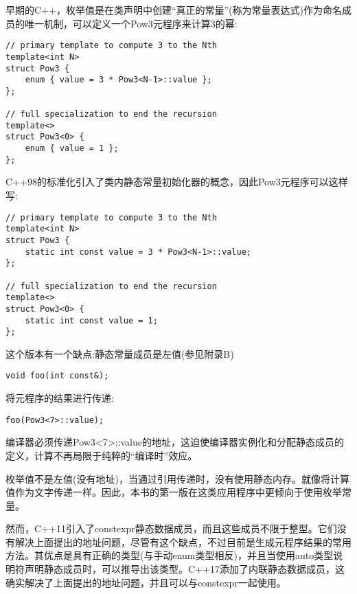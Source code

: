 
早期的C++，枚举值是在类声明中创建“真正的常量”(称为常量表达式)作为命名成员的唯一机制，可以定义一个Pow3元程序来计算3的幂:

\begin{lstlisting}[style=styleCXX]
// primary template to compute 3 to the Nth
template<int N>
struct Pow3 {
	enum { value = 3 * Pow3<N-1>::value };
};

// full specialization to end the recursion
template<>
struct Pow3<0> {
	enum { value = 1 };
};
\end{lstlisting}

C++98的标准化引入了类内静态常量初始化器的概念，因此Pow3元程序可以这样写:

\begin{lstlisting}[style=styleCXX]
// primary template to compute 3 to the Nth
template<int N>
struct Pow3 {
	static int const value = 3 * Pow3<N-1>::value;
};

// full specialization to end the recursion
template<>
struct Pow3<0> {
	static int const value = 1;
};
\end{lstlisting}

这个版本有一个缺点:静态常量成员是左值(参见附录B)

\begin{lstlisting}[style=styleCXX]
void foo(int const&);
\end{lstlisting}

将元程序的结果进行传递:

\begin{lstlisting}[style=styleCXX]
foo(Pow3<7>::value);
\end{lstlisting}

编译器必须传递Pow3<7>::value的地址，这迫使编译器实例化和分配静态成员的定义，计算不再局限于纯粹的“编译时”效应。

枚举值不是左值(没有地址)，当通过引用传递时，没有使用静态内存。就像将计算值作为文字传递一样。因此，本书的第一版在这类应用程序中更倾向于使用枚举常量。

然而，C++11引入了constexpr静态数据成员，而且这些成员不限于整型。它们没有解决上面提出的地址问题，尽管有这个缺点，不过目前是生成元程序结果的常用方法。其优点是具有正确的类型(与手动enum类型相反)，并且当使用auto类型说明符声明静态成员时，可以推导出该类型。C++17添加了内联静态数据成员，这确实解决了上面提出的地址问题，并且可以与constexpr一起使用。























